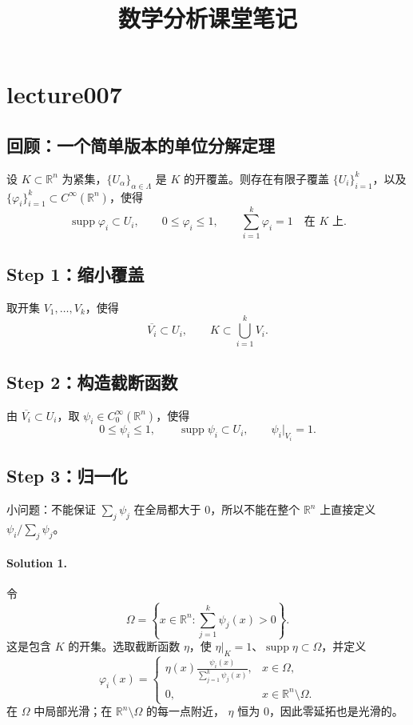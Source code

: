 \documentclass[11pt,a4paper]{ctexart}
\title{数学分析课堂笔记}
\author{}
\date{}
\newcommand{\supp}{\operatorname{supp}}
\begin{document}
\maketitle

\section*{lecture007}
\subsection*{回顾：一个简单版本的单位分解定理}

设 $K\subset\mathbb R^n$ 为紧集，$\{U_\alpha\}_{\alpha\in\Lambda}$
是 $K$ 的开覆盖。则存在有限子覆盖 $\{U_i\}_{i=1}^k$，以及
$\{\varphi_i\}_{i=1}^k\subset C^\infty(\mathbb R^n)$，使得
\[
 \supp\varphi_i\subset U_i,\qquad 0\leq\varphi_i\leq1,
 \qquad \sum_{i=1}^k\varphi_i=1\quad\text{在 }K\text{ 上}.
\]

\subsection*{Step 1：缩小覆盖}
取开集 $V_1,\ldots,V_k$，使得
\[
 \overline{V_i}\subset U_i,\qquad K\subset\bigcup_{i=1}^kV_i.
\]

\subsection*{Step 2：构造截断函数}
由 $\overline{V_i}\subset U_i$，取 $\psi_i\in C_0^\infty(\mathbb R^n)$，使得
\[
 0\leq\psi_i\leq1,\qquad \supp\psi_i\subset U_i,
 \qquad \psi_i|_{V_i}=1.
\]

\subsection*{Step 3：归一化}
小问题：不能保证 $\sum_j\psi_j$ 在全局都大于 $0$，所以不能在整个
$\mathbb R^n$ 上直接定义 $\psi_i/\sum_j\psi_j$。

\paragraph{Solution 1.}
令
\[
 \Omega=\left\{x\in\mathbb R^n:\sum_{j=1}^k\psi_j(x)>0\right\}.
\]
这是包含 $K$ 的开集。选取截断函数 $\eta$，使
$\eta|_K=1$、$\supp\eta\subset\Omega$，并定义
\[
 \varphi_i(x)=
 \begin{cases}
 \displaystyle\eta(x)\frac{\psi_i(x)}{\sum_{j=1}^k\psi_j(x)},&x\in\Omega,\\[6pt]
 0,&x\in\mathbb R^n\setminus\Omega.
 \end{cases}
\]
在 $\Omega$ 中局部光滑；在 $\mathbb R^n\setminus\Omega$ 的每一点附近，
$\eta$ 恒为 $0$，因此零延拓也是光滑的。
\end{document}
